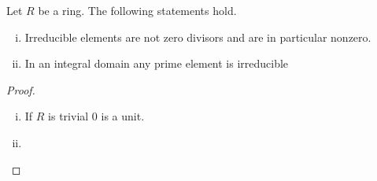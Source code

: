 	\begin{lemma}
		Let $R$ be a ring. The following statements hold.
		\begin{enumerate}[(i)]
			\item{
				Irreducible elements are not zero divisors and are in particular nonzero.
			}
			\item{
				In an integral domain any prime element is irreducible
			}
		\end{enumerate}
	\end{lemma}
	\begin{proof}
		\begin{enumerate}[(i)]
			\item{
				If $R$ is trivial $0$ is a unit.
			}
			\item{

			}
		\end{enumerate}
	\end{proof}

